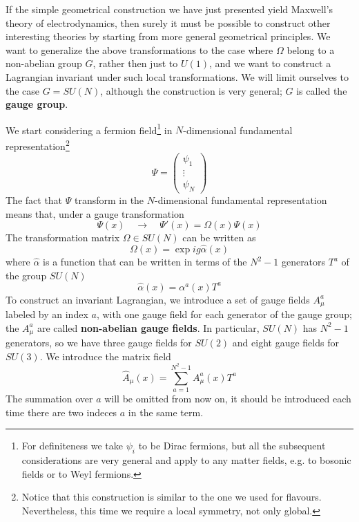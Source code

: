 \documentclass[TheoreticalPhy_ModB.tex]{subfiles}
\begin{document}
If the simple geometrical construction we have just presented yield Maxwell's theory of electrodynamics, then surely it must be possible to construct other interesting theories by starting from more general geometrical principles. We want to generalize the above transformations to the case where $\Omega$ belong to a non-abelian group $G$, rather then just to $U(1)$, and we want to construct a Lagrangian invariant under such local transformations. We will limit ourselves to the case $G=SU(N)$, although the construction is very general; $G$ is called the \textbf{gauge group}.

We start considering a fermion field\footnote{For definiteness we take $\psi_i$ to be Dirac fermions, but all the subsequent considerations are very general and apply to any matter fields, e.g. to bosonic fields or to Weyl fermions.} in $N$-dimensional fundamental representation\footnote{Notice that this construction is similar to the one we used for flavours. Nevertheless, this time we require a local symmetry, not only global.}
\[\Psi=\begin{pmatrix}\psi_1\\\vdots\\\psi_N\end{pmatrix}\]
The fact that $\Psi$ transform in the $N$-dimensional fundamental representation means that, under a gauge transformation
\[\Psi(x)\quad\to\quad\Psi'(x)=\Omega(x)\Psi(x)\]
The transformation matrix $\Omega\in SU(N)$ can be written as
\[\Omega(x)=\exp{ig\hat\alpha(x)}\]
where $\hat\alpha$ is a function that can be written in terms of the $N^2-1$ generators $T^a$ of the group $SU(N)$
\begin{equation}\label{eqn:alpha-deco-gauge}
\hat\alpha(x)=\alpha^a(x)T^a
\end{equation}
To construct an invariant Lagrangian, we introduce a set of gauge fields $A_\mu^a$ labeled by an index $a$, with one gauge field for each generator of the gauge group; the $A_\mu^a$ are called \textbf{non-abelian gauge fields}.   In particular, $SU(N)$ has $N^2-1$ generators, so we have three gauge fields for $SU(2)$ and eight gauge fields for $SU(3)$. We introduce the matrix field
\begin{equation}\label{eqn:matrix-vector-pot-gauge}
\hat A_\mu(x)=\sum_{a=1}^{N^2-1}A_\mu^a(x)T^a
\end{equation}
The summation over $a$ will be omitted from now on, it should be introduced each time there are two indeces $a$ in the same term. 
\end{document}

